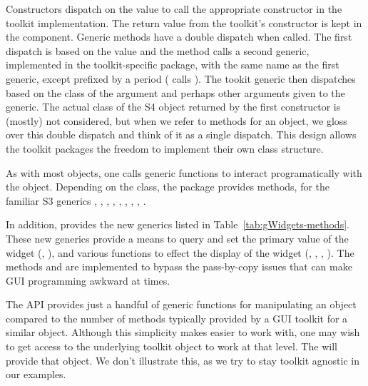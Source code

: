 Constructors dispatch on the  value to call the
appropriate constructor in the toolkit implementation. The return
value from the toolkit's constructor is kept in the 
component.  Generic methods have a double dispatch when called. The
first dispatch is based on the  value and the method
calls a second generic, implemented in the toolkit-specific package,
with the same name as the first generic, except prefixed by a period
( calls ). The tookit generic then
dispatches based on the class of the  argument and
perhaps other arguments given to the generic. The actual class of the
S4 object returned by the first constructor is (mostly) not
considered, but when we refer to methods for an object, we gloss over
this double dispatch and think of it as a single dispatch. This design
allows the toolkit packages the freedom to implement their own class
structure.

As with most \R\/ objects, one calls generic functions to
interact programatically with the object. Depending on the class, the
 package provides methods, for the
familiar S3 generics \generic{[}, \generic{[$<$-}, ,
, , ,
, , .

In addition,  provides the new generics listed in
Table~\ref{tab:gWidgets-methods}.  These new generics provide a means
to query and set the primary value of the widget (,
), and various functions to effect the display of
the widget (, ,
, ). The methods 
and  are implemented to bypass the pass-by-copy
issues that can make GUI programming awkward at times.


The  API provides just a handful of generic functions
for manipulating an object compared to the number of methods typically
provided by a GUI toolkit for a similar object. Although this
simplicity makes  easier to work with, one may wish to
get access to the underlying toolkit object to work at that level. The
 will provide that object. We don't
illustrate this, as we try to stay toolkit agnostic in our examples.


